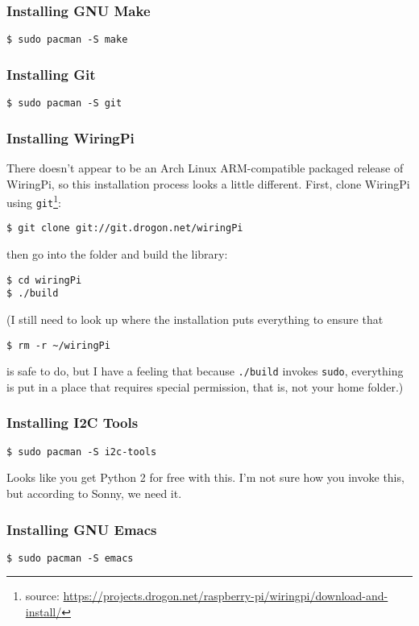 \documentclass[12pt,letterpaper]{article}
\begin{document}
\subsubsection{Installing GNU Make}
\begin{lstlisting}
$ sudo pacman -S make
\end{lstlisting}

\subsubsection{Installing Git}
\begin{lstlisting}
$ sudo pacman -S git
\end{lstlisting}

\subsubsection{Installing WiringPi}
There doesn't appear to be an Arch Linux ARM-compatible packaged release of WiringPi, so this installation process looks a little different.  First, clone WiringPi using \lstinline{git}\footnote{source: \url{https://projects.drogon.net/raspberry-pi/wiringpi/download-and-install/}}:
\begin{lstlisting}
$ git clone git://git.drogon.net/wiringPi
\end{lstlisting}
then go into the folder and build the library:
\begin{lstlisting}
$ cd wiringPi
$ ./build
\end{lstlisting}

(I still need to look up where the installation puts everything to ensure that
\begin{lstlisting}
$ rm -r ~/wiringPi
\end{lstlisting}
is safe to do, but I have a feeling that because \lstinline{./build} invokes \lstinline{sudo}, everything is put in a place that requires special permission, that is, not your home folder.)

\subsubsection{Installing I2C Tools}
\begin{lstlisting}
$ sudo pacman -S i2c-tools
\end{lstlisting}

Looks like you get Python 2 for free with this.  I'm not sure how you invoke this, but according to Sonny, we need it.

\subsubsection{Installing GNU Emacs}
\begin{lstlisting}
$ sudo pacman -S emacs
\end{lstlisting}
\end{document}
